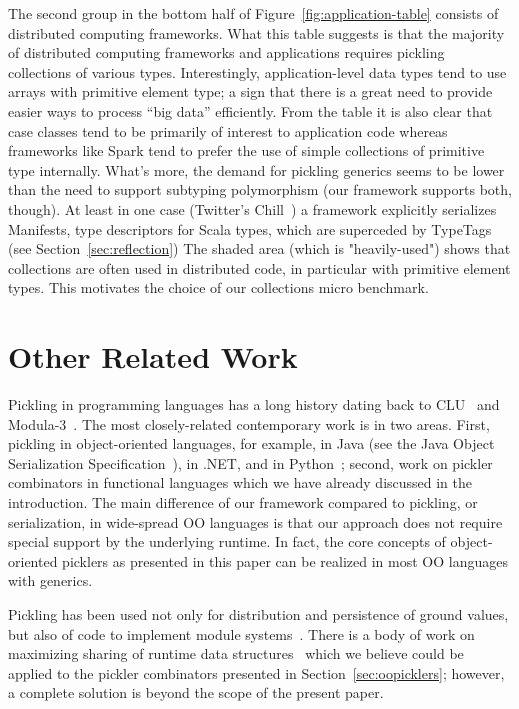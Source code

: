 \documentclass[preprint,10pt]{sigplanconf}
\theoremstyle{definition}
\theoremstyle{definition}
\begin{document}
The second group in the bottom half of Figure~\ref{fig:application-table}
consists of distributed computing {frameworks}. What this table
suggests is that the majority of distributed computing frameworks and
applications requires pickling collections of various
types. Interestingly, application-level data types tend to use arrays
with primitive element type; a sign that there is a great need to
provide easier ways to process ``big data'' efficiently. From the
table it is also clear that case classes tend to be primarily of
interest to application code whereas frameworks like Spark tend to
prefer the use of simple collections of primitive type
internally. What's more, the demand for pickling generics seems to be
lower than the need to support subtyping polymorphism (our framework
supports both, though). At least in one case (Twitter's Chill~\cite{TwitterChill}) a
framework explicitly serializes Manifests, type descriptors for Scala
types, which are superceded by TypeTags (see
Section~\ref{sec:reflection}) The shaded area (which is "heavily-used") shows that collections are often used in distributed code, in particular with primitive element types. This motivates the choice of our collections micro benchmark.




\section{Other Related Work}
\label{sec:related-work}

Pickling in programming languages has a long history dating back to
CLU~\cite{HerlihyL82} and Modula-3~\cite{CardelliDJKN89}. The most
closely-related contemporary work is in two areas. First, pickling in
object-oriented languages, for example, in Java (see the Java Object
Serialization Specification~\cite{JavaSerialization}), in .NET, and in
Python~\cite{Rossum07}; second, work on pickler combinators in
functional languages which we have already discussed in the
introduction. The main difference of our framework compared to
pickling, or serialization, in wide-spread OO languages is that our
approach does not require special support by the underlying
runtime. In fact, the core concepts of object-oriented picklers as
presented in this paper can be realized in most OO languages with
generics.

Pickling has been used not only for distribution and persistence of
ground values, but also of code to implement module
systems~\cite{Roy99,Rossberg2007}. There is a body of work on
maximizing sharing of runtime data
structures~\cite{appel93hashconsing,Elsman2005,TackKS06} which we
believe could be applied to the pickler combinators presented in
Section~\ref{sec:oopicklers}; however, a complete solution is beyond
the scope of the present paper.
\end{document}

